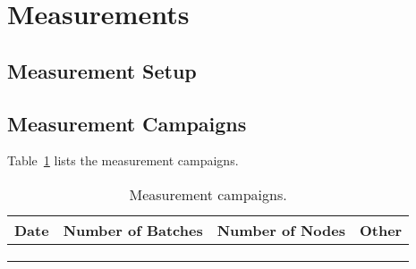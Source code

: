 
\section{Measurements}

\subsection{Measurement Setup}

\subsection{Measurement Campaigns}

Table~\ref{tab:measurements} lists the measurement campaigns.

\begin{table}[h!]
\centering
\caption{Measurement campaigns.}
\begin{tabular}{|c|c|c|c|}
\hline
\textbf{Date} & \textbf{Number of Batches} & \textbf{Number of Nodes} & \textbf{Other} \\
\hline
&&&\\
\hline
&&&\\
\hline
&&&\\
\hline
\end{tabular}
\label{tab:measurements}
\end{table}



